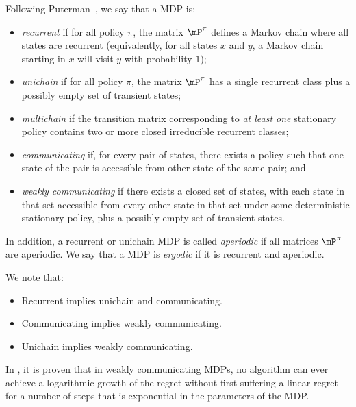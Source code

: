 Following Puterman~\cite{puterman2014markov}, we say that a MDP is:
\begin{itemize}
    \item \emph{recurrent} if for all policy $\pi$, the matrix $\mP^\pi$ defines a Markov chain where all states are recurrent (equivalently, for all states $x$ and $y$, a Markov chain starting in $x$ will visit $y$ with probability $1$);
    \item \emph{unichain} if for all policy $\pi$, the matrix $\mP^\pi$ has a single recurrent class plus a possibly empty set of transient states;
    \item \emph{multichain} if the transition matrix corresponding to \emph{at least one} stationary policy contains two or more closed irreducible recurrent classes;
    \item \emph{communicating} if, for every pair of states, there exists a policy such that one state of the pair is accessible from other state of the same pair; and
    \item \emph{weakly communicating} if there exists a closed set of states, with each state in that set accessible from every other state in that set under some deterministic stationary policy, plus a possibly empty set of transient states.
\end{itemize}
In addition, a recurrent or unichain MDP is called \emph{aperiodic} if all matrices $\mP^\pi$ are aperiodic.  We say that a MDP is \emph{ergodic} if it is recurrent and aperiodic. 

We note that:
\begin{itemize}
    \item Recurrent implies unichain and communicating.
    \item Communicating implies weakly communicating.
    \item Unichain implies weakly communicating.
\end{itemize}

In \cite{fruit2018near}, it is proven that in weakly communicating MDPs, no algorithm can ever achieve a logarithmic growth of the regret without first suffering a linear regret for a number of steps that is exponential in the parameters of the MDP.

